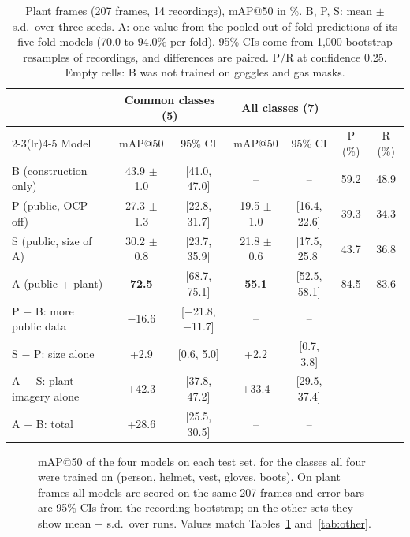 \begin{table}[H]
\caption{Plant frames (207 frames, 14 recordings), mAP@50 in \%. B, P, S: mean $\pm$ s.d.\ over three seeds. A: one value from the pooled out-of-fold predictions of its five fold models (70.0 to 94.0\% per fold). 95\% CIs come from 1{,}000 bootstrap resamples of recordings, and differences are paired. P/R at confidence 0.25. Empty cells: B was not trained on goggles and gas masks.}
\label{tab:main}
\centering
\scriptsize
\setlength{\tabcolsep}{3.5pt}
\begin{tabular}{lcccccc}
\toprule
& \multicolumn{2}{c}{Common classes (5)} & \multicolumn{2}{c}{All classes (7)} & & \\
\cmidrule(lr){2-3}\cmidrule(lr){4-5}
Model & mAP@50 & 95\% CI & mAP@50 & 95\% CI & P (\%) & R (\%) \\
\midrule
B (construction only) & 43.9 $\pm$ 1.0 & [41.0, 47.0] & -- & -- & 59.2 & 48.9 \\
P (public, OCP off) & 27.3 $\pm$ 1.3 & [22.8, 31.7] & 19.5 $\pm$ 1.0 & [16.4, 22.6] & 39.3 & 34.3 \\
S (public, size of A) & 30.2 $\pm$ 0.8 & [23.7, 35.9] & 21.8 $\pm$ 0.6 & [17.5, 25.8] & 43.7 & 36.8 \\
A (public + plant) & \textbf{72.5} & [68.7, 75.1] & \textbf{55.1} & [52.5, 58.1] & 84.5 & 83.6 \\
\midrule
P $-$ B: more public data & $-$16.6 & [$-$21.8, $-$11.7] & -- & -- & & \\
S $-$ P: size alone & +2.9 & [0.6, 5.0] & +2.2 & [0.7, 3.8] & & \\
A $-$ S: plant imagery alone & +42.3 & [37.8, 47.2] & +33.4 & [29.5, 37.4] & & \\
A $-$ B: total & +28.6 & [25.5, 30.5] & -- & -- & & \\
\bottomrule
\end{tabular}
\end{table}

\begin{figure}[H]
\centering
{}
\caption{mAP@50 of the four models on each test set, for the classes all four were trained on (person, helmet, vest, gloves, boots). On plant frames all models are scored on the same 207 frames and error bars are 95\% CIs from the recording bootstrap; on the other sets they show mean $\pm$ s.d.\ over runs. Values match Tables~\ref{tab:main} and~\ref{tab:other}.}
\label{fig:bars}
\end{figure}

